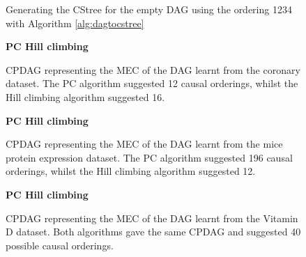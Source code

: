 \documentclass{tufte-book}
\begin{document}
  \begin{figure}\label{fig:dagtocstree_full}
   \begin{floatrow}
   \centeringy
{}%
\hfill
{}
\caption{Generating the CStree for the empty DAG using the ordering 1234 with Algorithm \ref{alg:dagtocstree}}
\end{floatrow}\end{figure}



\begin{figure}
   \begin{floatrow}
   \centering
   \textbf{\hspace{5mm}PC \hspace{60mm} Hill climbing }\par\medskip
{}%
\hfill
{}
   \end{floatrow}
   \caption{CPDAG representing the MEC of the DAG learnt from the coronary dataset. The PC algorithm suggested 12 causal orderings, whilst the Hill climbing algorithm suggested 16.}
\end{figure}

\begin{figure}
   \begin{floatrow}
   \centering
   \textbf{\hspace{5mm}PC \hspace{60mm} Hill climbing }\par\medskip
{}%
\hfill
{}
   \end{floatrow}
   \caption{CPDAG representing the MEC of the DAG learnt from the mice protein expression dataset. The PC algorithm suggested 196 causal orderings, whilst the Hill climbing algorithm suggested 12.}
\end{figure}


\begin{figure}
   \begin{floatrow}
   \centering
   \textbf{\hspace{5mm}PC \hspace{60mm} Hill climbing }\par\medskip
{}%
\hfill
{}
   \end{floatrow}
   \caption{CPDAG representing the MEC of the DAG learnt from the Vitamin D dataset. Both algorithms gave the same CPDAG and suggested 40 possible causal orderings.}
\end{figure}
\end{document}
